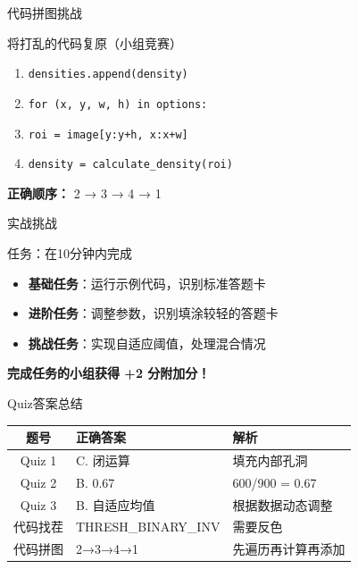 \begin{frame}{代码拼图挑战}
    \begin{block}{将打乱的代码复原（小组竞赛）}
    \begin{enumerate}
        \item \texttt{densities.append(density)}
        \item \texttt{for (x, y, w, h) in options:}
        \item \texttt{roi = image[y:y+h, x:x+w]}
        \item \texttt{density = calculate\_density(roi)}
    \end{enumerate}
    \end{block}

    \vspace{0.5cm}

    \textbf{正确顺序：} 2 → 3 → 4 → 1
\end{frame}

\begin{frame}{实战挑战}
    \begin{block}{任务：在10分钟内完成}
    \begin{itemize}
        \item \textbf{基础任务}：运行示例代码，识别标准答题卡
        \item \textbf{进阶任务}：调整参数，识别填涂较轻的答题卡
        \item \textbf{挑战任务}：实现自适应阈值，处理混合情况
    \end{itemize}
    \end{block}

    \vspace{0.3cm}

    \begin{center}
        \textbf{完成任务的小组获得 +2 分附加分！}
    \end{center}
\end{frame}

\begin{frame}{Quiz答案总结}
    \begin{table}
        \centering
        \begin{tabular}{cll}
        \toprule
        题号 & 正确答案 & 解析 \\
        \midrule
        Quiz 1 & C. 闭运算 & 填充内部孔洞 \\
        Quiz 2 & B. 0.67 & 600/900 = 0.67 \\
        Quiz 3 & B. 自适应均值 & 根据数据动态调整 \\
        代码找茬 & THRESH\_BINARY\_INV & 需要反色 \\
        代码拼图 & 2→3→4→1 & 先遍历再计算再添加 \\
        \bottomrule
        \end{tabular}
    \end{table}
\end{frame}
